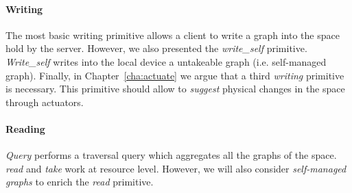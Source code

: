 \paragraph{Writing}

The most basic writing primitive allows a client to write a graph into the space hold by the server.
However, we also presented the \emph{write\_self} primitive.
\emph{Write\_self} writes into the local device a untakeable graph (i.e. self-managed graph).
Finally, in Chapter~\ref{cha:actuate} we argue that a third \emph{writing} primitive is necessary.
This primitive should allow to \emph{suggest} physical changes in the space through actuators.


\paragraph{Reading}

\emph{Query} performs a traversal query which aggregates all the graphs of the space.
\emph{read} and \emph{take} work at resource level.
However, we will also consider \emph{self-managed graphs} to enrich the \emph{read} primitive. %